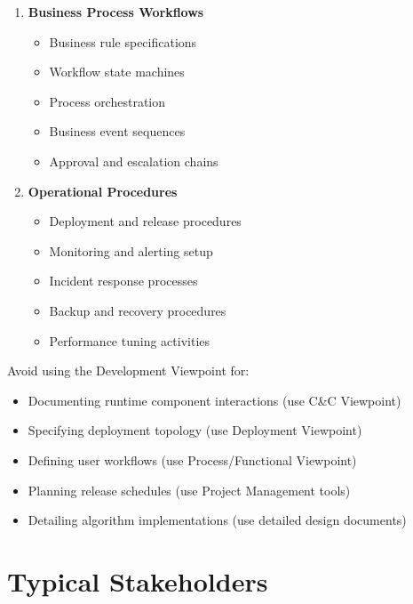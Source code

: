 \documentclass[11pt,letterpaper]{article}
\begin{document}
\begin{enumerate}[label=\textbf{AC\arabic*:}, leftmargin=2.5em]
    \item \textbf{Business Process Workflows}
    \begin{itemize}[nosep]
        \item Business rule specifications
        \item Workflow state machines
        \item Process orchestration
        \item Business event sequences
        \item Approval and escalation chains
    \end{itemize}
    
    \item \textbf{Operational Procedures}
    \begin{itemize}[nosep]
        \item Deployment and release procedures
        \item Monitoring and alerting setup
        \item Incident response processes
        \item Backup and recovery procedures
        \item Performance tuning activities
    \end{itemize}
\end{enumerate}

\begin{warningbox}
Avoid using the Development Viewpoint for:

\begin{itemize}[nosep]
    \item Documenting runtime component interactions (use C\&C Viewpoint)
    \item Specifying deployment topology (use Deployment Viewpoint)
    \item Defining user workflows (use Process/Functional Viewpoint)
    \item Planning release schedules (use Project Management tools)
    \item Detailing algorithm implementations (use detailed design documents)
\end{itemize}
\end{warningbox}

\section{Typical Stakeholders}
\end{document}
